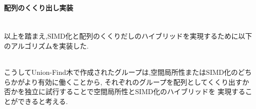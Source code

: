 \paragraph{配列のくくり出し実装}~\\

以上を踏まえ,SIMD化と配列のくくりだしのハイブリッドを実現するために以下のアルゴリズムを実装した.\\

{\footnotesize

}~\\
こうしてUnion-Find木で作成されたグループは,空間局所性またはSIMD化のどちらかがより有効に働くことから,
それぞれのグループを配列としてくくり出すか否かを独立に試行することで空間局所性とSIMD化のハイブリッドを
実現することができると考える.\\
